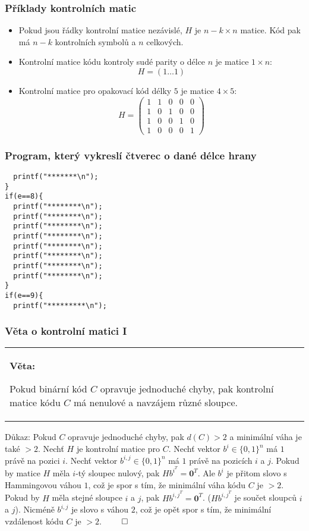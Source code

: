 \documentclass{beamer}
\newenvironment{veta}
{
    \begin{center}
    \begin{tabular}{p{9cm}}
    \textbf{Věta:}
}
{
    \end{tabular}
    \end{center}
}
\newcommand{\zero}{\textbf{0}}
\newcommand{\emptyline}{\\$\,$\\}
\newenvironment{itemizey}%
  {\large \begin{itemize}%
    \setlength{\itemsep}{6pt}%
    \setlength{\parskip}{6pt}}%
  {\end{itemize}}
\begin{document}
\begin{frame}[t,fragile]\frametitle{Příklady kontrolních matic} 
    \begin{itemizey}
        \item Pokud jsou řádky kontrolní matice nezávislé, $H$ je $n-k\times n$ matice. Kód pak má $n-k$ kontrolních symbolů a $n$ celkových.
        \item Kontrolní matice kódu kontroly sudé parity o délce $n$ je matice $1\times n$:
$$
H = (1\dots1)
$$
        \item Kontrolní matice pro opakovací kód délky $5$ je matice $4\times5$:
$$
H=
\begin{pmatrix}
1&1&0&0&0\\
1&0&1&0&0\\
1&0&0&1&0\\
1&0&0&0&1
\end{pmatrix}
$$
    \end{itemizey}
\end{frame}


\begin{frame}[t,fragile]\frametitle{Program, který vykreslí čtverec o dané délce hrany} 
\begin{verbatim} 
  printf("*******\n");
}
if(e==8){
  printf("********\n");
  printf("********\n");
  printf("********\n");
  printf("********\n");
  printf("********\n");
  printf("********\n");
  printf("********\n");
  printf("********\n");
}
if(e==9){
  printf("*********\n");
\end{verbatim}
\end{frame}




\begin{frame}[t,fragile]\frametitle{Věta o kontrolní matici I} 
    \begin{veta}
Pokud binární kód $C$ opravuje jednoduché chyby, pak kontrolní matice kódu $C$ má nenulové a navzájem různé sloupce. 
    \end{veta}

    Důkaz: Pokud $C$ opravuje jednoduché chyby, pak $d(C)>2$ a minimální váha je také $>2$. Nechť $H$ je kontrolní matice pro $C$. Nechť vektor $b^i\in\{0,1\}^n$ má $1$ právě na pozici $i$. Nechť vektor $b^{i,j}\in\{0,1\}^n$ má $1$ právě na pozicích $i$ a $j$. Pokud by matice $H$ měla $i$-tý sloupec nulový, pak $Hb^{i^T}=\zero^T$. Ale $b^i$ je přitom slovo s Hammingovou váhou $1$, což je spor s tím, že minimální váha kódu $C$ je $>2$.
\emptyline
    Pokud by $H$ měla stejné sloupce $i$ a $j$, pak $Hb^{{i,j}^T}=\zero^T$. ($Hb^{{i,j}^T}$ je součet sloupců $i$ a $j$). Nicméně $b^{i,j}$ je slovo s váhou $2$, což je opět spor s tím, že minimální vzdálenost kódu $C$ je $>2$. $\qed$
\end{frame}
\end{document}
